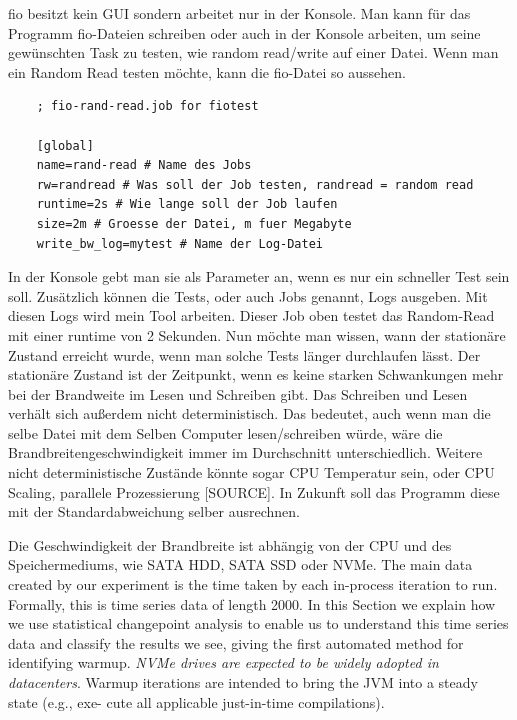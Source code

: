 \documentclass{article}
\begin{document}
fio besitzt kein GUI sondern arbeitet nur in der Konsole. Man kann für das Programm fio-Dateien schreiben oder auch in der Konsole arbeiten,
um seine gewünschten Task zu testen,
wie random read/write auf einer Datei.
Wenn man ein Random Read testen möchte, kann die fio-Datei so aussehen.
\newline
\begin{lstlisting}
    ; fio-rand-read.job for fiotest

    [global]
    name=rand-read # Name des Jobs
    rw=randread # Was soll der Job testen, randread = random read
    runtime=2s # Wie lange soll der Job laufen
    size=2m # Groesse der Datei, m fuer Megabyte
    write_bw_log=mytest # Name der Log-Datei
\end{lstlisting}
\bigskip
In der Konsole gebt man sie als Parameter an, wenn es nur ein schneller Test sein soll. Zusätzlich können die Tests, 
oder auch Jobs genannt, Logs ausgeben. Mit diesen Logs wird mein Tool arbeiten. Dieser Job oben testet das Random-Read mit einer
runtime von 2 Sekunden. Nun möchte man wissen, wann der stationäre Zustand erreicht wurde, wenn man solche Tests länger durchlaufen lässt.
Der stationäre Zustand ist der Zeitpunkt, wenn es keine starken Schwankungen mehr bei der Brandweite im Lesen und Schreiben gibt.
Das Schreiben und Lesen verhält sich außerdem nicht deterministisch. Das bedeutet, auch wenn man die selbe Datei mit dem Selben Computer lesen/schreiben
würde, wäre die Brandbreitengeschwindigkeit immer im Durchschnitt unterschiedlich. Weitere nicht deterministische Zustände könnte sogar CPU Temperatur sein,
oder CPU Scaling, parallele Prozessierung [SOURCE]. In Zukunft soll das Programm diese mit der Standardabweichung selber ausrechnen. 

Die Geschwindigkeit der Brandbreite ist abhängig von der CPU und des Speichermediums, wie SATA HDD, SATA SSD oder NVMe.
The main data created by our experiment is the time taken by each in-process iteration to run.
Formally, this is time series data of length 2000. In this Section we explain how we use statistical
changepoint analysis to enable us to understand this time series data and classify the results we
see, giving the first automated method for identifying warmup.
\textit{NVMe drives are expected to be widely adopted in datacenters}.
Warmup iterations
are intended to bring the JVM into a steady state (e.g., exe-
cute all applicable just-in-time compilations).
\end{document}
